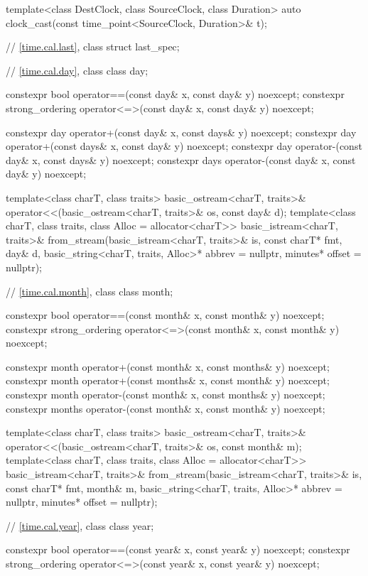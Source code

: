 \begin{codeblock}
{  template<class DestClock, class SourceClock, class Duration>
    auto clock_cast(const time_point<SourceClock, Duration>& t);

  // \ref{time.cal.last}, class 
  struct last_spec;

  // \ref{time.cal.day}, class 
  class day;

  constexpr bool operator==(const day& x, const day& y) noexcept;
  constexpr strong_ordering operator<=>(const day& x, const day& y) noexcept;

  constexpr day  operator+(const day&  x, const days& y) noexcept;
  constexpr day  operator+(const days& x, const day&  y) noexcept;
  constexpr day  operator-(const day&  x, const days& y) noexcept;
  constexpr days operator-(const day&  x, const day&  y) noexcept;

  template<class charT, class traits>
    basic_ostream<charT, traits>&
      operator<<(basic_ostream<charT, traits>& os, const day& d);
  template<class charT, class traits, class Alloc = allocator<charT>>
    basic_istream<charT, traits>&
      from_stream(basic_istream<charT, traits>& is, const charT* fmt,
                  day& d, basic_string<charT, traits, Alloc>* abbrev = nullptr,
                  minutes* offset = nullptr);

  // \ref{time.cal.month}, class 
  class month;

  constexpr bool operator==(const month& x, const month& y) noexcept;
  constexpr strong_ordering operator<=>(const month& x, const month& y) noexcept;

  constexpr month  operator+(const month&  x, const months& y) noexcept;
  constexpr month  operator+(const months& x,  const month& y) noexcept;
  constexpr month  operator-(const month&  x, const months& y) noexcept;
  constexpr months operator-(const month&  x,  const month& y) noexcept;

  template<class charT, class traits>
    basic_ostream<charT, traits>&
      operator<<(basic_ostream<charT, traits>& os, const month& m);
  template<class charT, class traits, class Alloc = allocator<charT>>
    basic_istream<charT, traits>&
      from_stream(basic_istream<charT, traits>& is, const charT* fmt,
                  month& m, basic_string<charT, traits, Alloc>* abbrev = nullptr,
                  minutes* offset = nullptr);

  // \ref{time.cal.year}, class 
  class year;

  constexpr bool operator==(const year& x, const year& y) noexcept;
  constexpr strong_ordering operator<=>(const year& x, const year& y) noexcept;

}
\end{codeblock}
